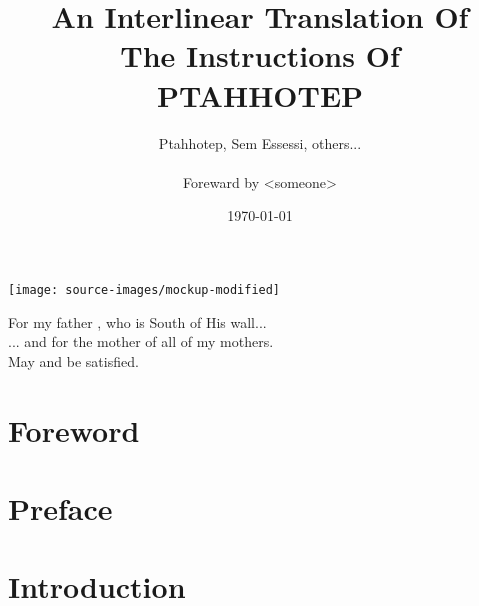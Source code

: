 \documentclass[a4paper,pagesize,8pt,pointlessnumbers,normalheadings,oneside]{book}
\title{
	\small An Interlinear Translation Of\\
	\large The Instructions Of\\
	\huge PTAHHOTEP}
\author{Ptahhotep, Sem Essessi, others...\\\\Foreward by <someone>}
\date{\today}
\begin{document}
\maketitle

\vspace*{\fill}
\begin{center}
\texttt{[image: source-images/mockup-modified]}
\end{center}
\vspace*{\fill}
\pagebreak

\vspace*{\fill}
\begin{center}
For my father , who is South of His wall...\\
\vspace{7.5mm}
... and for  the mother of all of my mothers.\\
\vspace{15mm}
May  and  be satisfied.\\
\end{center}
\vspace*{\fill}

\tableofcontents

\markboth{}{}

\newlength\q
\setlength{}

\chapter*{Foreword}

\markboth{}{}

\chapter*{Preface}

\markboth{}{}

\chapter*{Introduction}


\pagebreak

\printindex
\end{document}

